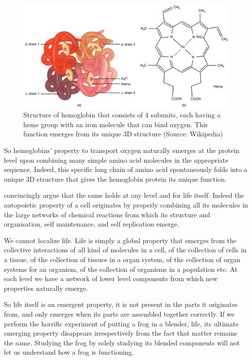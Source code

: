 \documentclass[
  11pt,
]{book}
\begin{document}
\begin{figure}

{\centering \includegraphics[width=0.5\linewidth]{./figs/hemoglobin} 

}

\caption{Structure of hemoglobin that consists of 4 subunits, each having a heme group with an iron molecule that can bind oxygen. This function emerges from its unique 3D structure (Source: Wikipedia)}\label{fig:hemoglobin}
\end{figure}

So hemoglobins' property to transport oxygen naturally emerges at the protein level upon combining many simple amino acid molecules in the appropriate sequence. Indeed, this specific long chain of amino acid spontaneously folds into a unique 3D structure that gives the hemoglobin protein its unique function.

\citet{capraLuisi2014} convincingly argue that the same holds at any level and for life itself. Indeed the autopoietic property of a cell originates by properly combining all its molecules in the large networks of chemical reactions from which its structure and organisation, self maintenance, and self replication emerge.

We cannot localize life. Life is simply a global property that emerges from the collective interactions of all kind of molecules in a cell, of the collection of cells in a tissue, of the collection of tissues in a organ system, of the collection of organ systems for an organism, of the collection of organisms in a population etc.
At each level we have a network of lower level components from which new properties naturally emerge.

So life itself is an emergent property, it is not present in the parts it originates from, and only emerges when its parts are assembled together correctly. If we perform the horrific experiment of putting a frog in a blender, life, its ultimate emerging property disappears irrespectively from the fact that matter remains the same. Studying the frog by solely studying its blended components will not let us understand how a frog is functioning.
\end{document}
